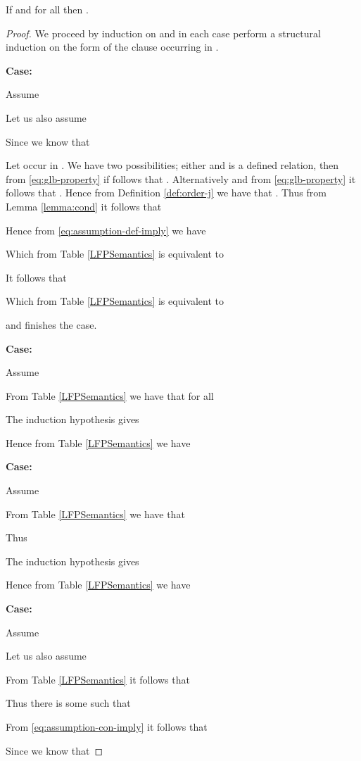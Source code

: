 \begin{lemma}\label{lemma:cl}
  If  and  for all  then .
\end{lemma}
\begin{proof}
We proceed by induction on  and in each case perform a structural
induction on the form of the clause  occurring in .

\noindent\textbf{Case: }

\noindent Assume

Let us also assume

Since  we know that

Let  occur in . We have two possibilities; either
 and  is a defined relation, then from
\eqref{eq:glb-property} if follows that . Alternatively  and from
\eqref{eq:glb-property} it follows that . Hence from Definition \ref{def:order-j} we have that
. Thus from Lemma \ref{lemma:cond} it
follows that

Hence from \eqref{eq:assumption-def-imply} we have

Which from Table \ref{LFPSemantics} is equivalent to

It follows that

Which from Table \ref{LFPSemantics} is equivalent to

and finishes the case.

\noindent\textbf{Case: }

\noindent Assume

From Table \ref{LFPSemantics} we have that for all 

The induction hypothesis gives

Hence from Table \ref{LFPSemantics} we have


\noindent\textbf{Case: }

\noindent Assume

From Table \ref{LFPSemantics} we have that

Thus

The induction hypothesis gives

Hence from Table \ref{LFPSemantics} we have


\noindent\textbf{Case: }

\noindent Assume

Let us also assume

From Table \ref{LFPSemantics} it follows that

Thus there is some  such that

From \eqref{eq:assumption-con-imply} it follows that

Since  we know that


\end{proof}
